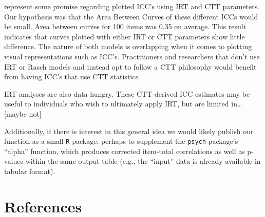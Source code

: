 \documentclass[
  jou]{apa6}
\begin{document}
represent some promise regarding plotted ICC's using IRT and CTT parameters. Our hypothesis was that the Area Between Curves of these different ICCs would be small. Area between curves for 100 items was 0.35 on average. This result indicates that curves plotted with either IRT or CTT parameters show little difference. The nature of both models is overlapping when it comes to plotting visual representations such as ICC's. Practitioners and researchers that don't use IRT or Rasch models and instead opt to follow a CTT philosophy would benefit from having ICC's that use CTT statistics.

IRT analyses are also data hungry. These CTT-derived ICC estimates may be useful to individuals who wish to ultimately apply IRT, but are limited in\ldots{} {[}maybe not{]}

Additionally, if there is interest in this general idea we would likely publish our function as a small \texttt{R} package, perhaps to supplement the \texttt{psych} package's ``alpha'' function, which produces corrected item-total correlations as well as p-values within the same output table (e.g., the ``input'' data is already available in tabular format).

\newpage

\hypertarget{references}{%
\section{References}\label{references}}

\begingroup
\setlength{\parindent}{-0.5in}
\setlength{\leftskip}{0.5in}
\end{document}
